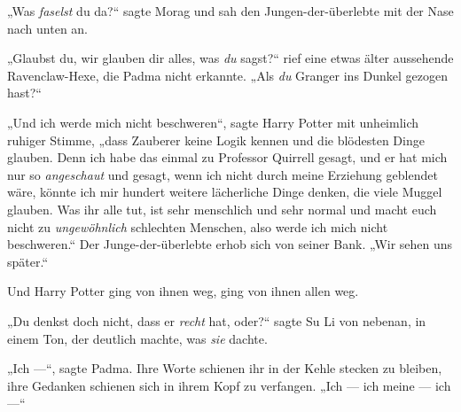 „Was \emph{faselst} du da?“ sagte Morag und sah den Jungen-der-überlebte mit der Nase nach unten an.

„Glaubst du, wir glauben dir alles, was \emph{du} sagst?“ rief eine etwas älter aussehende Ravenclaw-Hexe, die Padma nicht erkannte.
„Als \emph{du} Granger ins Dunkel gezogen hast?“

„Und ich werde mich nicht beschweren“, sagte Harry Potter mit unheimlich ruhiger Stimme, „dass Zauberer keine Logik kennen und die blödesten Dinge glauben. Denn ich habe das einmal zu Professor Quirrell gesagt, und er hat mich nur so \emph{angeschaut} und gesagt, wenn ich nicht durch meine Erziehung geblendet wäre, könnte ich mir hundert weitere lächerliche Dinge denken, die viele Muggel glauben. Was ihr alle tut, ist sehr menschlich und sehr normal und macht euch nicht zu \emph{ungewöhnlich} schlechten Menschen, also werde ich mich nicht beschweren.“
Der Junge-der-überlebte erhob sich von seiner Bank.
„Wir sehen uns später.“

Und Harry Potter ging von ihnen weg, ging von ihnen allen weg.

„Du denkst doch nicht, dass er \emph{recht} hat, oder?“ sagte Su Li von nebenan, in einem Ton, der deutlich machte, was \emph{sie} dachte.

„Ich —“, sagte Padma. Ihre Worte schienen ihr in der Kehle stecken zu bleiben, ihre Gedanken schienen sich in ihrem Kopf zu verfangen.
„Ich — ich meine — ich —“

